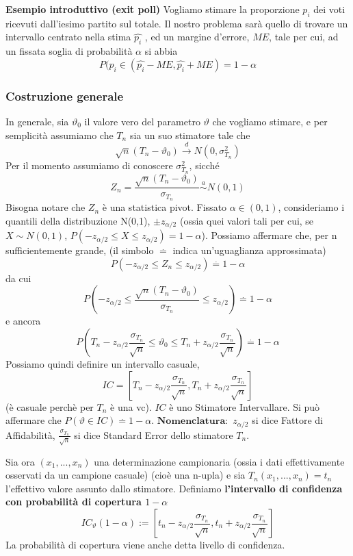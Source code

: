 \textbf{Esempio introduttivo (exit poll)}
Vogliamo stimare la proporzione $p_i$ dei voti ricevuti dall'iesimo partito sul totale. Il nostro problema sarà quello di trovare un intervallo centrato nella stima $\hat{p_i}$ , ed un margine d'errore, $ME$, tale per cui, ad un fissata soglia di probabilità $\alpha$ si abbia $$P(p_i \in (\hat{p_i} - ME,\hat{p_i} + ME)=1 - \alpha$$
\subsubsection{Costruzione generale}
In generale, sia $\vartheta_0$ il valore vero del parametro $\vartheta$ che vogliamo stimare, e per semplicità assumiamo che $T_n$ sia un suo stimatore tale che 
$$\sqrt{n}(T_n - \vartheta_0)\stackrel{d}{\rightarrow}N(0,\sigma_{T_n}^2)$$
Per il momento assumiamo di conoscere $\sigma_{T_n}^2$, sicché
$$Z_n=\frac{\sqrt{n}(T_n - \vartheta_0)}{\sigma_{T_n}} \stackrel{a}{\sim}N(0,1)$$ Bisogna notare che $Z_n$ è una statistica pivot.
Fissato $\alpha \in (0,1)$, consideriamo i quantili della distribuzione N(0,1), $\pm z_{\alpha / 2}$ (ossia quei valori tali per cui, se $X \sim N(0,1)$, $P(-z_{\alpha / 2} \leq X \leq z_{\alpha / 2})=1-\alpha$). Possiamo affermare che, per n sufficientemente grande, (il simbolo $\stackrel{.}{=}$ indica un'uguaglianza approssimata) $$P(-z_{\alpha / 2} \leq Z_n \leq z_{\alpha / 2})\stackrel{.}{=}1-\alpha$$ da cui
$$P(-z_{\alpha / 2} \leq \frac{\sqrt{n}(T_n - \vartheta_0)}{\sigma_{T_n}} \leq z_{\alpha / 2})\stackrel{.}{=}1-\alpha $$ e ancora
$$P(T_n - z_{\alpha / 2} \frac{\sigma_{T_n}}{\sqrt{n}} \leq \vartheta_0 \leq T_n+z_{\alpha / 2} \frac{\sigma_{T_n}}{\sqrt{n}})\stackrel{.}{=}1-\alpha$$
Possiamo quindi definire un intervallo casuale, $$IC=\left[T_n - z_{\alpha / 2} \frac{\sigma_{T_n}}{\sqrt{n}},T_n + z_{\alpha / 2} \frac{\sigma_{T_n}}{\sqrt{n}}\right]$$ (è casuale perchè per $T_n$ è una vc). $IC$ è uno Stimatore Intervallare.
Si può affermare che $P(\vartheta \in IC) \stackrel {.}{=} 1 - \alpha$.
$\textbf{Nomenclatura}:$
$z_{\alpha / 2}$ si dice Fattore di Affidabilità,
$\frac{\sigma_{T_n}}{\sqrt{n}}$ si dice Standard Error dello stimatore $T_n$.

Sia ora $(x_1,...,x_n)$ una determinazione campionaria (ossia i dati effettivamente osservati da un campione casuale) (cioè una n-upla) e sia $T_n(x_1,...,x_n)=t_n$ l'effettivo valore assunto dallo stimatore.
Definiamo \textbf{l'intervallo di confidenza con probabilità di copertura $1-\alpha$} $$IC_\vartheta (1-\alpha) := \left[t_n - z_{\alpha / 2} \frac{\sigma_{T_n}}{\sqrt{n}}, t_n + z_{\alpha / 2} \frac{\sigma_{T_n}}{\sqrt{n}}\right]$$
La probabilità di copertura viene anche detta livello di confidenza.

